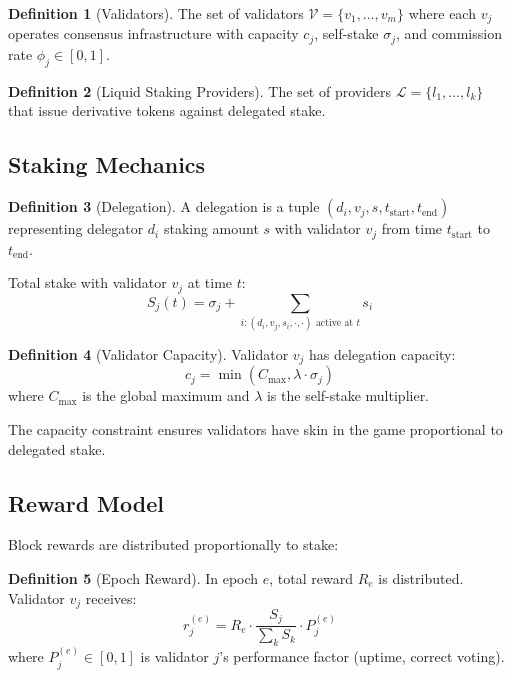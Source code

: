 \documentclass[11pt,a4paper]{article}
\theoremstyle{definition}
\newtheorem{definition}{Definition}[section]
\theoremstyle{remark}
\begin{document}
\begin{definition}[Validators]
The set of validators $\mathcal{V} = \{v_1, \ldots, v_m\}$ where each $v_j$ operates consensus infrastructure with capacity $c_j$, self-stake $\sigma_j$, and commission rate $\phi_j \in [0, 1]$.
\end{definition}

\begin{definition}[Liquid Staking Providers]
The set of providers $\mathcal{L} = \{l_1, \ldots, l_k\}$ that issue derivative tokens against delegated stake.
\end{definition}

\subsection{Staking Mechanics}

\begin{definition}[Delegation]
A delegation is a tuple $(d_i, v_j, s, t_{\text{start}}, t_{\text{end}})$ representing delegator $d_i$ staking amount $s$ with validator $v_j$ from time $t_{\text{start}}$ to $t_{\text{end}}$.
\end{definition}

Total stake with validator $v_j$ at time $t$:
\begin{equation}
    S_j(t) = \sigma_j + \sum_{i: (d_i, v_j, s_i, \cdot, \cdot) \text{ active at } t} s_i
\end{equation}

\begin{definition}[Validator Capacity]
Validator $v_j$ has delegation capacity:
\begin{equation}
    c_j = \min(C_{\max}, \lambda \cdot \sigma_j)
\end{equation}
where $C_{\max}$ is the global maximum and $\lambda$ is the self-stake multiplier.
\end{definition}

The capacity constraint ensures validators have skin in the game proportional to delegated stake.

\subsection{Reward Model}

Block rewards are distributed proportionally to stake:

\begin{definition}[Epoch Reward]
In epoch $e$, total reward $R_e$ is distributed. Validator $v_j$ receives:
\begin{equation}
    r_j^{(e)} = R_e \cdot \frac{S_j}{\sum_{k} S_k} \cdot P_j^{(e)}
\end{equation}
where $P_j^{(e)} \in [0, 1]$ is validator $j$'s performance factor (uptime, correct voting).
\end{definition}
\end{document}
